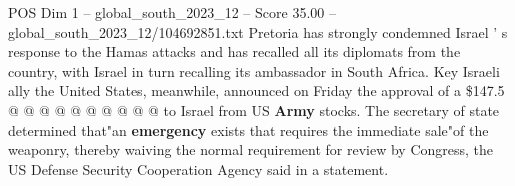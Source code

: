 \begin{textsample}{POS Dim 1 – global\_south\_2023\_12 – Score 35.00 – global\_south\_2023\_12/104692851.txt}
Pretoria has strongly condemned Israel ' s response to the Hamas attacks and has recalled all its diplomats from the country, with Israel in turn recalling its ambassador in South Africa.
Key Israeli ally the United States, meanwhile, announced on Friday the approval of a \$147.5 @ @ @ @ @ @ @ @ @ @ to Israel from US \textbf{Army} stocks.
The secretary of state determined that"an \textbf{emergency} exists that requires the immediate sale"of the weaponry, thereby waiving the normal requirement for review by Congress, the US Defense Security Cooperation Agency said in a statement.

\end{textsample}

